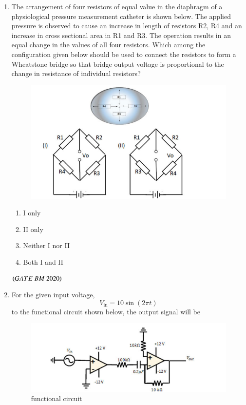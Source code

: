 \documentclass[journal,12pt,onecolumn]{IEEEtran}
\theoremstyle{remark}
\begin{document}
\begin{enumerate}
\item The arrangement of four resistors of equal value in the diaphragm of a
physiological pressure measurement catheter is shown below. The applied pressure
is observed to cause an increase in length of resistors R2, R4 and an increase in cross sectional area in R1 and R3. The operation results in an equal change in the values of all four resistors. Which among the configuration given below should be used to connect the resistors to form a Wheatstone bridge so that bridge output voltage is proportional to the change in resistance of individual resistors?\\
\begin{figure}[H]
\centering
\includegraphics[width=0.4\columnwidth]{Figs/fig2.png}
\label{fig:placeholder}
\end{figure}


\begin{enumerate}[label=\alph*)] 
\item\hspace{0.5cm} I only
\item\hspace{0.5cm} II only
\item\hspace{0.5cm} Neither I nor II
\item\hspace{0.5cm} Both I and II
\end{enumerate}
\hfill $\left(GATE\ BM\ 2020\right)$\\

\item For the given input voltage,\[V_{\text{in}} = 10 \sin\left( 2\pi t \right)
\]to the functional circuit shown below, the output signal will be
\begin{figure}[H]
\centering
\includegraphics[width=0.4\columnwidth]{Figs/fig3.png}
\caption{functional circuit}
\label{fig:placeholder}
\end{figure}


\end{enumerate}
\end{document}
